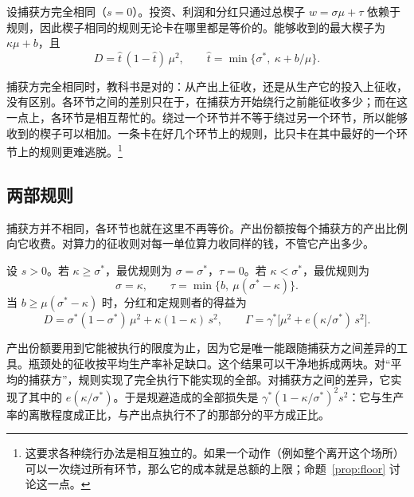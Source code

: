 \begin{proposition}[不变性]\label{prop:inv}
设捕获方完全相同（\allowbreak $s=0$）。投资、利润和分红只通过总楔子 $w=\sigma\mu+\tau$ 依赖于规则，因此楔子相同的规则无论卡在哪里都是等价的。能够收到的最大楔子为 $\kappa\mu+b$，且
\begin{equation}
  D=\hat t\,(1-\hat t)\,\mu^2, \qquad \hat t=\min\bigl\{\sigma^*,\ \kappa+b/\mu\bigr\}.
\end{equation}
\end{proposition}

捕获方完全相同时，教科书是对的：从产出上征收，还是从生产它的投入上征收，没有区别。各环节之间的差别只在于，在捕获方开始绕行之前能征收多少；而在这一点上，各环节是相互帮忙的。绕过一个环节并不等于绕过另一个环节，所以能够收到的楔子可以相加。一条卡在好几个环节上的规则，比只卡在其中最好的一个环节上的规则更难逃脱。\footnote{这要求各种绕行办法是相互独立的。如果一个动作（例如整个离开这个场所）可以一次绕过所有环节，那么它的成本就是总额的上限；命题~\ref{prop:floor} 讨论这一点。}

\subsection{两部规则}

捕获方并不相同，各环节也就在这里不再等价。产出份额按每个捕获方的产出比例向它收费。对算力的征收则对每一单位算力收同样的钱，不管它产出多少。

\begin{proposition}[两部规则]\label{prop:two}
设 $s>0$。若 $\kappa\ge\sigma^*$，最优规则为 $\sigma=\sigma^*$，\allowbreak $\tau=0$。若
$\kappa<\sigma^*$，最优规则为
\begin{equation}\label{eq:two}
  \sigma=\kappa, \qquad \tau=\min\bigl\{b,\ \mu(\sigma^*-\kappa)\bigr\}.
\end{equation}
当 $b\ge\mu(\sigma^*-\kappa)$ 时，分红和定规则者的得益为
\begin{equation}\label{eq:split}
  D=\sigma^*(1-\sigma^*)\,\mu^2+\kappa(1-\kappa)\,s^2, \qquad
  \Gamma=\gamma^*\bigl[\mu^2+e(\kappa/\sigma^*)\,s^2\bigr].
\end{equation}
\end{proposition}

产出份额要用到它能被执行的限度为止，因为它是唯一能跟随捕获方之间差异的工具。瓶颈处的征收按平均生产率补足缺口。这个结果可以干净地拆成两块。对“平均的捕获方”，规则实现了完全执行下能实现的全部。对捕获方之间的差异，它实现了其中的 $e(\kappa/\sigma^*)$。于是规避造成的全部损失是 $\gamma^*(1-\kappa/\sigma^*)^2s^2$：它与生产率的离散程度成正比，与产出点执行不了的那部分的平方成正比。

